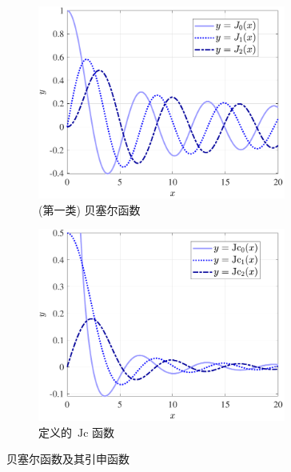 \documentclass[UTF8]{report}
\def\Jc{\mathrm{\,Jc}}
\theoremstyle{MyLineTheoremStyle} %
\theoremstyle{MyBlockTheoremStyle} %
\theoremstyle{MySubsubsectionStyle} %
\begin{document}
\begin{figure}[H]\centering
\begin{subfigure}[b]{0.5\columnwidth}\centering
    \includegraphics[height=180pt]{assets/4/4.3 贝塞尔函数 J.pdf}
    \caption{(第一类) 贝塞尔函数}
\end{subfigure}\hfill
\begin{subfigure}[b]{0.5\columnwidth}\centering
    \includegraphics[height=180pt]{assets/4/4.3 Jc 函数.pdf}
    \caption{定义的 $\Jc$ 函数}
\end{subfigure}
\caption{贝塞尔函数及其引申函数}
\label{贝塞尔函数及其引申函数}
\end{figure}
\end{document}
